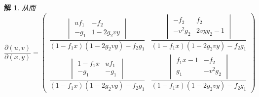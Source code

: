 \documentclass[a4paper,12pt]{article}
\newtheorem*{sol}{解}
\begin{document}
\begin{sol}
    从而
    $$\frac{\partial(u,v)}{\partial(x,y)} = \begin{pmatrix}
            \dfrac{\begin{vmatrix}
                           uf_1 & -f_2        \\
                           -g_1 & 1 - 2g_2 vy
                       \end{vmatrix}}{(1 - f_1 x)(1 - 2g_2 vy) - f_2 g_1} & \dfrac{\begin{vmatrix}
                                                                                       -f_2     & f_2         \\
                                                                                       -v^2 g_2 & 2vy g_2 - 1
                                                                                   \end{vmatrix}}{(1 - f_1 x)(1 - 2g_2 vy) - f_2 g_1} \\[20pt]
            \dfrac{\begin{vmatrix}
                           1 - f_1 x & uf_1 \\
                           -g_1      & -g_1
                       \end{vmatrix}}{(1 - f_1 x)(1 - 2g_2 vy) - f_2 g_1} & \dfrac{\begin{vmatrix}
                                                                                       f_1 x - 1 & -f_2     \\
                                                                                       g_1       & -v^2 g_2
                                                                                   \end{vmatrix}}{(1 - f_1 x)(1 - 2g_2 vy) - f_2 g_1}
        \end{pmatrix}$$
\end{sol}
\end{document}
